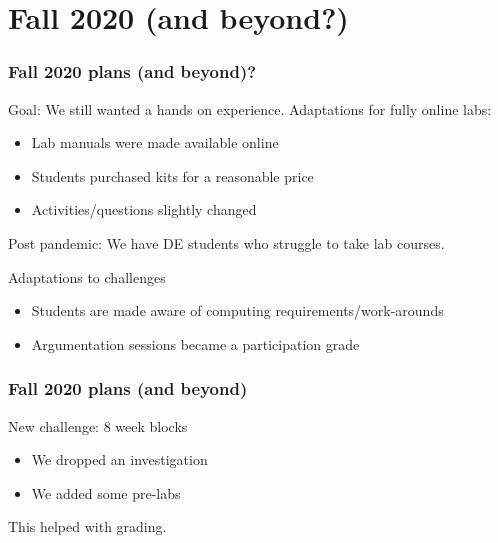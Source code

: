 \documentclass[aspectratio=169,shadow=true]{beamer}
\begin{document}
\section{Fall 2020 (and beyond?)}
{\nologo
\begin{frame}
  \frametitle{Fall 2020 plans (and beyond)?}
  \begin{block}{Goal:  We still wanted a hands on experience.}
    Adaptations for fully online labs:
    \begin{itemize}
      \item Lab manuals were made available online
      \item Students purchased kits for a reasonable price
      \item Activities/questions slightly changed
    \end{itemize}
    Post pandemic: We have DE students who struggle to take lab courses.
  \end{block}
  \begin{block}{Adaptations to challenges}
    \begin{itemize}
      \item Students are made aware of computing requirements/work-arounds
      \item Argumentation sessions became a participation grade
    \end{itemize}
  \end{block}
\end{frame}
}

\begin{frame}
  \frametitle{Fall 2020 plans (and beyond)}
  \begin{block}{New challenge:  8 week blocks}
    \begin{itemize}
      \item We dropped an investigation
      \item We added some pre-labs
    \end{itemize}
    This helped with grading.
  \end{block}
\end{frame}
\end{document}
